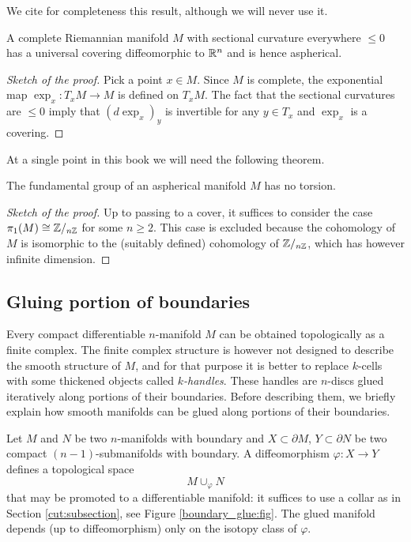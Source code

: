 We cite for completeness this result, although we will never use it. 

\begin{teo} A complete Riemannian manifold $M$ with sectional curvature everywhere $\leqslant 0$ has a universal covering diffeomorphic to $\mathbb{R}^n$ and is hence aspherical.
\end{teo}
\begin{proof}[Sketch of the proof]
Pick a point $x\in M$. Since $M$ is complete, the exponential map $\exp_x\colon T_xM \to M$ is defined on $T_xM$. The fact that the sectional curvatures are $\leqslant 0$ imply that $(d\exp_x)_y$ is invertible for any $y\in T_x$ and $\exp_x$ is a covering.
\end{proof}

At a single point in this book we will need the following theorem.
\begin{teo} \label{no:torsion:aspherical:teo}
The fundamental group of an aspherical manifold $M$ has no torsion.
\end{teo}
\begin{proof}[Sketch of the proof]
Up to passing to a cover, it suffices to consider the case $\pi_1(M) \cong \mathbb{Z}/_{n\mathbb{Z}}$ for some $n\geqslant 2$. This case is excluded because the cohomology of $M$ is isomorphic to the (suitably defined) cohomology of $\mathbb{Z}/_{n\mathbb{Z}}$, which has however infinite dimension.
\end{proof}

\subsection{Gluing portion of boundaries}
Every compact differentiable $n$-manifold $M$ can be obtained topologically as a finite complex. The finite complex structure is however not designed to describe the smooth structure of $M$, and for that purpose it is better to replace $k$-cells with some thickened objects called \emph{$k$-handles}. These handles are $n$-discs glued iteratively along portions of their boundaries. Before describing them, we briefly explain how smooth manifolds can be glued along portions of their boundaries.

Let $M$ and $N$ be two $n$-manifolds with boundary and $X\subset \partial M$, $Y\subset \partial N$ be two compact $(n-1)$-submanifolds with boundary. A diffeomorphism $\varphi\colon X\to Y$ defines a topological space
$$M \cup_{\varphi} N$$
that may be promoted to a differentiable manifold: it suffices to use a collar as in Section \ref{cut:subsection}, see Figure \ref{boundary_glue:fig}.
The glued manifold depends (up to diffeomorphism) only on the isotopy class of $\varphi$.

